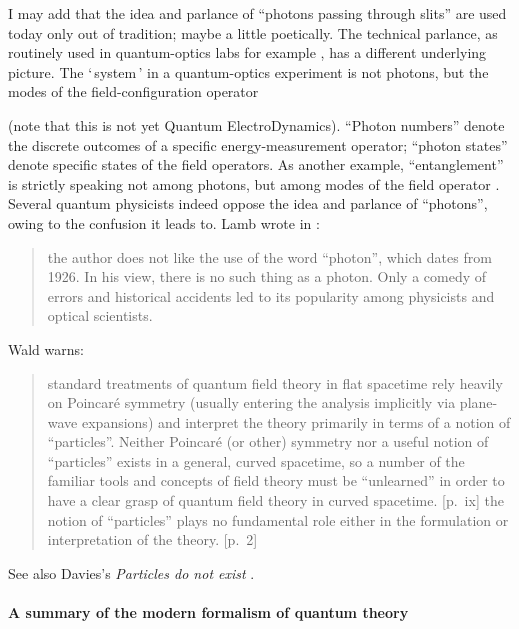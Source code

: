 \documentclass[\ifafour a4paper,12pt,\else a5paper,10pt,\fi%
onecolumn,oneside,article,%
british%
]{memoir}
\newcommand*{\defquote}[1]{`\,#1\,'}
\theoremstyle{remark}
\theoremstyle{innote}
\newcommand*{\citep}{\parencites}%
\newcommand*{\citey}{\parencites*}
\newcommand*{\ibid}{\unspace\addtocounter{footnote}{-1}\footnotemark{}}
\renewcommand*{\|}[1][]{\nonscript\,#1\vert\nonscript\;\mathopen{}}
\begin{document}
I may add that the idea and parlance of \enquote{photons passing through
  slits} are used today only out of tradition; maybe a little poetically.
The technical parlance, as routinely used in quantum-optics labs for
example \citep{leonhardt1997,bachoretal1998_r2004}, has a different
underlying picture. The \defquote{system} in a quantum-optics experiment is
not photons, but the modes of the field-configuration operator\ibid (note
that this is not yet Quantum ElectroDynamics). \enquote{Photon numbers}
denote the discrete outcomes of a specific energy-measurement operator;
\enquote{photon states} denote specific states of the field operators. As
another example, \enquote{entanglement} is strictly speaking not among
photons, but among modes of the field operator \citep{vanenk2003b}. Several
quantum physicists indeed oppose the idea and parlance of
\enquote{photons}, owing to the confusion it leads to. Lamb \citep[of the
Lamb shift,][]{lambetal1947} wrote in \cite*{lamb1995}:
\begin{quote}
  \footnotesize the author does not like the use of the word ``photon'',
  which dates from 1926. In his view, there is no such thing as a photon.
  Only a comedy of errors and historical accidents led to its popularity
  among physicists and optical scientists.
\end{quote}
Wald \citey{wald1994} warns:
\begin{quote}
  \footnotesize standard treatments of quantum field theory in flat
  spacetime rely heavily on Poincar\'e symmetry (usually entering the
  analysis implicitly via plane-wave expansions) and interpret the theory
  primarily in terms of a notion of ``particles''. Neither Poincar\'e (or
  other) symmetry nor a useful notion of ``particles'' exists in a general,
  curved spacetime, so a number of the familiar tools and concepts of field
  theory must be ``unlearned'' in order to have a clear grasp of quantum
  field theory in curved spacetime. [p.~ix] \textelp{} the notion of
  ``particles'' plays no fundamental role either in the formulation or
  interpretation of the theory. [p.~2]
\end{quote}
See also Davies's \emph{Particles do not exist} \citey{davies1984}.

\bigskip

\paragraph{A summary of the modern formalism of quantum theory}
\end{document}
